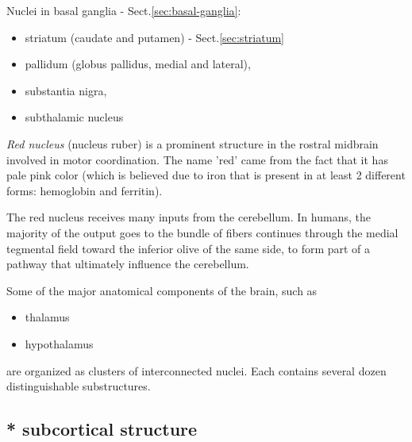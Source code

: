 Nuclei in basal ganglia - Sect.\ref{sec:basal-ganglia}:
\begin{itemize}
  \item striatum (caudate and putamen) - Sect.\ref{sec:striatum} 
  
  \item pallidum (globus pallidus, medial and
  lateral), 
  
  \item substantia nigra, 
  
  \item subthalamic nucleus
\end{itemize}


\label{sec:red_nucleus}
{\it Red nucleus} (nucleus ruber) is a prominent structure in the rostral
midbrain involved in motor coordination. The name 'red' came from the fact that it has
pale pink color (which is believed due to iron that is present in at least 2
different forms: hemoglobin and ferritin).

The red nucleus receives many inputs from the cerebellum.
In humans, the majority of the output goes to the bundle of fibers continues
through the medial tegmental field toward the inferior olive of the same side,
to form part of a pathway that ultimately influence the cerebellum.

Some of the major anatomical components of the brain, such as 
\begin{itemize}
  \item thalamus
  \item hypothalamus
\end{itemize} 
are organized as clusters of interconnected nuclei. 
Each contains several dozen distinguishable substructures.


\subsection{* subcortical structure}
\label{sec:subcortical-structure}

